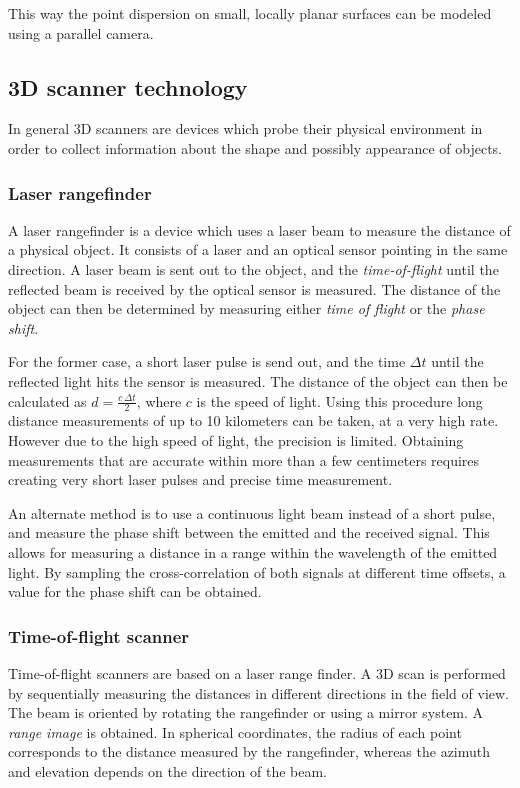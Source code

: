 This way the point dispersion on small, locally planar surfaces can be modeled using a parallel camera.


\subsection{3D scanner technology}
In general 3D scanners are devices which probe their physical environment in order to collect information about the shape and possibly appearance of objects.

\subsubsection{Laser rangefinder}
A laser rangefinder is a device which uses a laser beam to measure the distance of a physical object. It consists of a laser and an optical sensor pointing in the same direction. A laser beam is sent out to the object, and the \emph{time-of-flight} until the reflected beam is received by the optical sensor is measured. The distance of the object can then be determined by measuring either \emph{time of flight} or the \emph{phase shift}.

For the former case, a short laser pulse is send out, and the time $\Delta t$ until the reflected light hits the sensor is measured. The distance of the object can then be calculated as $d = \frac{c \, \Delta t}{2}$, where $c$ is the speed of light. Using this procedure long distance measurements of up to 10 kilometers can be taken, at a very high rate. However due to the high speed of light, the precision is limited. Obtaining measurements that are accurate within more than a few centimeters requires creating very short laser pulses and precise time measurement.

An alternate method is to use a continuous light beam instead of a short pulse, and measure the phase shift between the emitted and the received signal. This allows for measuring a distance in a range within the wavelength of the emitted light. By sampling the cross-correlation of both signals at different time offsets, a value for the phase shift can be obtained.

\subsubsection{Time-of-flight scanner}
Time-of-flight scanners are based on a laser range finder. A 3D scan is performed by sequentially measuring the distances in different directions in the field of view. The beam is oriented by rotating the rangefinder or using a mirror system. A \emph{range image} is obtained. In spherical coordinates, the radius of each point corresponds to the distance measured by the rangefinder, whereas the azimuth and elevation depends on the direction of the beam. 

